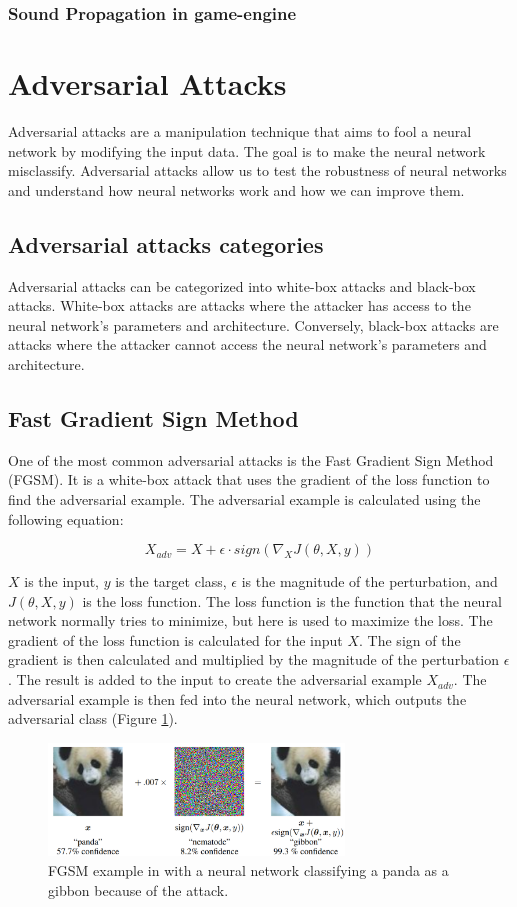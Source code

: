 \subsubsection{Sound Propagation in game-engine}

\section{Adversarial Attacks}

Adversarial attacks are a manipulation technique that aims to fool a neural network by modifying the input data. The goal is to make the neural network misclassify. Adversarial attacks allow us to test the robustness of neural networks and understand how neural networks work and how we can improve them.

\subsection{Adversarial attacks categories}

Adversarial attacks can be categorized into white-box attacks and black-box attacks. White-box attacks are attacks where the attacker has access to the neural network's parameters and architecture. Conversely, black-box attacks are attacks where the attacker cannot access the neural network's parameters and architecture.


\subsection{Fast Gradient Sign Method}

One of the most common adversarial attacks is the Fast Gradient Sign Method (FGSM)\cite{goodfellow2015explaining}. It is a white-box attack that uses the gradient of the loss function to find the adversarial example. The adversarial example is calculated using the following equation:

\begin{equation}
    X_{adv} = X + \epsilon \cdot sign(\nabla_{X}J(\theta, X, y))
\end{equation}

$X$ is the input, $y$ is the target class, $\epsilon$ is the magnitude of the perturbation, and $J(\theta, X, y)$ is the loss function. The loss function is the function that the neural network normally tries to minimize, but here is used to maximize the loss. The gradient of the loss function is calculated for the input $X$. The sign of the gradient is then calculated and multiplied by the magnitude of the perturbation $\epsilon$. The result is added to the input to create the adversarial example $X_{adv}$. The adversarial example is then fed into the neural network, which outputs the adversarial class (Figure \ref*{fig:fgsm}).

\begin{figure}[H]
    \centering
    \includegraphics[width=0.7\textwidth]{../Images/fgsm.png}
    \caption{FGSM example in \cite{goodfellow2015explaining} with a neural network classifying a panda as a gibbon because of the attack.}
    \label{fig:fgsm}
\end{figure}
